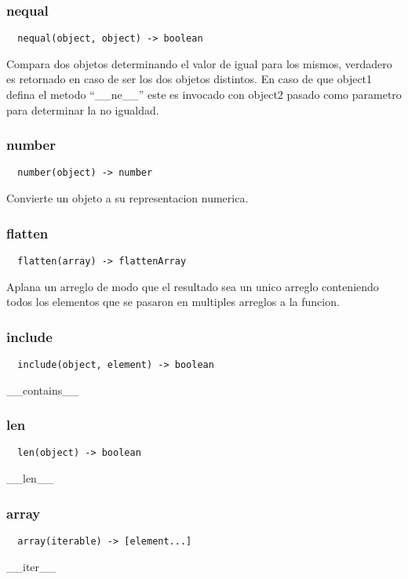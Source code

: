 \subsubsection*{nequal}
\begin{verbatim}
  nequal(object, object) -> boolean
\end{verbatim}
Compara dos objetos determinando el valor de igual para los mismos, verdadero es
retornado en caso de ser los dos objetos distintos.
En caso de que object1 defina el metodo ``__ne__'' este es invocado con object2
pasado como parametro para determinar la no igualdad.

\subsubsection*{number}
\begin{verbatim}
  number(object) -> number
\end{verbatim}
Convierte un objeto a su representacion numerica.

\subsubsection*{flatten}
\begin{verbatim}
  flatten(array) -> flattenArray
\end{verbatim}
Aplana un arreglo de modo que el resultado sea un unico arreglo conteniendo todos los elementos que se pasaron en multiples arreglos a la funcion.

\subsubsection*{include}
\begin{verbatim}
  include(object, element) -> boolean
\end{verbatim}
__contains__

\subsubsection*{len}
\begin{verbatim}
  len(object) -> boolean
\end{verbatim}
__len__

\subsubsection*{array}
\begin{verbatim}
  array(iterable) -> [element...]
\end{verbatim}
__iter__

